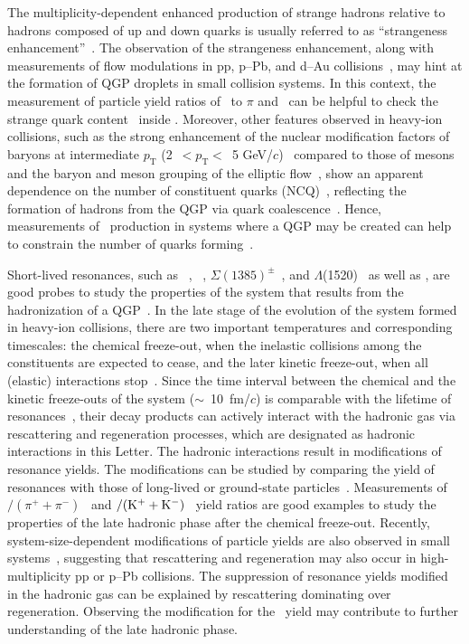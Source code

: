 The multiplicity-dependent enhanced production of strange hadrons relative to hadrons composed of up and down quarks is usually referred to as ``strangeness enhancement''~\cite{ALICE:2016fzo}. The observation of the strangeness enhancement, along with measurements of flow modulations in pp, p--Pb, and d--Au collisions~\cite{PHENIX:2018lia, ALICE:2021nir, ATLAS:2016yzd}, may hint at the formation of QGP droplets in small collision systems. In this context, the measurement of particle yield ratios of \fzero~to $\pi$ and \kstar~can be helpful to check the strange quark content~\cite{LHCb:2014ooi, LHCb:2014vbo} inside \fzero. Moreover, other features observed in heavy-ion collisions, such as the strong enhancement of the nuclear modification factors of baryons at intermediate $p_{\mathrm{T}}$ (2~$<p_{\mathrm{T}}<$~5 GeV/$c$)~\cite{Fries:2003vb, ALICE:2022wpn} compared to those of mesons and the baryon and meson grouping of the elliptic flow~\cite{Wang:2022det}, show an apparent dependence on the number of constituent quarks (NCQ)~\cite{Wang:2022det}, reflecting the formation of hadrons from the QGP via quark coalescence~\cite{Fries:2003vb}. Hence, measurements of \fzero~production in systems where a QGP may be created can help to constrain the number of quarks forming~\fzero.

Short-lived resonances, such as \rhoz~\cite{ALICE:2018qdv}, \kstar~\cite{ALICE:2019etb, ALICE:2016sak}, $\Sigma(1385)^{\pm}$~\cite{ALICE:2022zuc}, and $\Lambda$(1520)~\cite{ALICE:2018ewo} as well as \fzero, are good probes to study the properties of the system that results from the hadronization of a QGP~\cite{Bierlich:2021poz, Knospe:2015nva}. In the late stage of the evolution of the system formed in heavy-ion collisions, there are two important temperatures and corresponding timescales: the chemical freeze-out, when the inelastic collisions among the constituents are expected to cease, and the later kinetic freeze-out, when all (elastic) interactions stop~\cite{Song:1996ik}. Since the time interval between the chemical and the kinetic freeze-outs of the system ($\sim$~10~fm/$c$) is comparable with the lifetime of resonances~\cite{ALICE:2011dyt, ALICE:2019xyr}, their decay products can actively interact with the hadronic gas via rescattering and regeneration processes, which are designated as hadronic interactions in this Letter. The hadronic interactions result in modifications of resonance yields. The modifications can be studied by comparing the yield of resonances with those of long-lived or ground-state particles~\cite{ALICE:2018pal}. Measurements of \rhoz$/(\pi^{+}+\pi^{-})$~\cite{ALICE:2018qdv} and \kstar$\rm{}/(K^{+}+K^{-})$~\cite{ALICE:2019etb, ALICE:2016sak} yield ratios are good examples to study the properties of the late hadronic phase after the chemical freeze-out. Recently, system-size-dependent modifications of particle yields are also observed in small systems~\cite{ALICE:2016sak, ALICE:2019etb}, suggesting that rescattering and regeneration may also occur in high-multiplicity pp or p--Pb collisions. The suppression of resonance yields modified in the hadronic gas can be explained by rescattering dominating over regeneration. Observing the modification for the \fzero~yield may contribute to further understanding of the late hadronic phase.


